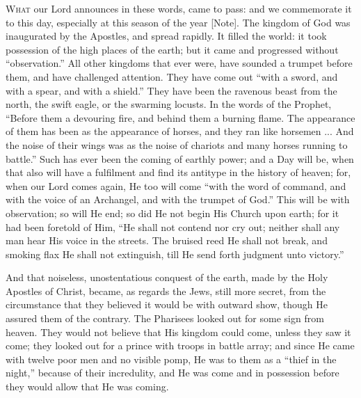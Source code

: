 W\textsc{hat} our Lord announces in these words, came to pass:
and we commemorate it to this day, especially at this
season of the year [Note]. The kingdom of God was inaugurated by
the Apostles, and spread rapidly. It filled the world: it
took possession of the high places of the earth; but it
came and progressed without ``observation.'' All
other kingdoms that ever were, have sounded a trumpet
before them, and have challenged attention. They have
come out ``with a sword, and with a spear, and with a
shield.'' They have been the ravenous beast from the
north, the swift eagle, or the swarming locusts. In the
words of the Prophet, ``Before them a devouring fire,
and behind them a burning flame. The appearance of them
has been as the appearance of horses, and they ran like
horsemen ... And the noise of their wings was as the
noise of chariots and many horses running to
battle.'' Such has ever been the coming of earthly
power; and a Day will be, when that also will have a
fulfilment and find its antitype in the history of
heaven; for, when our Lord comes again, He too will come
``with the word of command, and with the voice of an
Archangel, and with the trumpet of God.'' This will
be with observation; so will He end; so did He not begin
His Church upon earth; for it had been foretold of Him,
``He shall not contend nor cry out; neither shall any
man hear His voice in the streets. The bruised reed He
shall not break, and smoking flax He shall not
extinguish, till He send forth judgment unto
victory.''

And that noiseless, unostentatious conquest of the
earth, made by the Holy Apostles of Christ, became, as
regards the Jews, still more secret, from the
circumstance that they believed it would be with outward
show, though He assured them of the contrary. The
Pharisees looked out for some sign from heaven. They
would not believe that His kingdom could come, unless
they saw it come; they looked out for a prince with
troops in battle array; and since He came with twelve
poor men and no visible pomp, He was to them as a
``thief in the night,'' because of their
incredulity, and He was come and in possession before
they would allow that He was coming.

